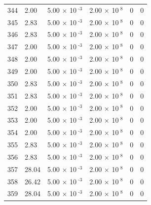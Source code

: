 \documentclass[a4paper,11pt]{article}
\begin{document}
\begin{center}
\begin{longtable}{|R{1.5cm}|R{2.4cm}|R{2.4cm}|R{2.4cm}|R{2.4cm}|R{2.4cm}|}
  344 &   2.00  &         5.00 $\times$ 10$^{\text{          -3}}$  &         2.00 $\times$ 10$^{\text{           8}}$  & 0  & 0 \\
  345 &   2.83  &         5.00 $\times$ 10$^{\text{          -3}}$  &         2.00 $\times$ 10$^{\text{           8}}$  & 0  & 0 \\
  346 &   2.83  &         5.00 $\times$ 10$^{\text{          -3}}$  &         2.00 $\times$ 10$^{\text{           8}}$  & 0  & 0 \\
  347 &   2.00  &         5.00 $\times$ 10$^{\text{          -3}}$  &         2.00 $\times$ 10$^{\text{           8}}$  & 0  & 0 \\
  348 &   2.00  &         5.00 $\times$ 10$^{\text{          -3}}$  &         2.00 $\times$ 10$^{\text{           8}}$  & 0  & 0 \\
  349 &   2.00  &         5.00 $\times$ 10$^{\text{          -3}}$  &         2.00 $\times$ 10$^{\text{           8}}$  & 0  & 0 \\
  350 &   2.83  &         5.00 $\times$ 10$^{\text{          -3}}$  &         2.00 $\times$ 10$^{\text{           8}}$  & 0  & 0 \\
  351 &   2.83  &         5.00 $\times$ 10$^{\text{          -3}}$  &         2.00 $\times$ 10$^{\text{           8}}$  & 0  & 0 \\
  352 &   2.00  &         5.00 $\times$ 10$^{\text{          -3}}$  &         2.00 $\times$ 10$^{\text{           8}}$  & 0  & 0 \\
  353 &   2.00  &         5.00 $\times$ 10$^{\text{          -3}}$  &         2.00 $\times$ 10$^{\text{           8}}$  & 0  & 0 \\
  354 &   2.00  &         5.00 $\times$ 10$^{\text{          -3}}$  &         2.00 $\times$ 10$^{\text{           8}}$  & 0  & 0 \\
  355 &   2.83  &         5.00 $\times$ 10$^{\text{          -3}}$  &         2.00 $\times$ 10$^{\text{           8}}$  & 0  & 0 \\
  356 &   2.83  &         5.00 $\times$ 10$^{\text{          -3}}$  &         2.00 $\times$ 10$^{\text{           8}}$  & 0  & 0 \\
  357 &  28.04  &         5.00 $\times$ 10$^{\text{          -3}}$  &         2.00 $\times$ 10$^{\text{           8}}$  & 0  & 0 \\
  358 &  26.42  &         5.00 $\times$ 10$^{\text{          -3}}$  &         2.00 $\times$ 10$^{\text{           8}}$  & 0  & 0 \\
  359 &  28.04  &         5.00 $\times$ 10$^{\text{          -3}}$  &         2.00 $\times$ 10$^{\text{           8}}$  & 0  & 0 \\

\end{longtable}
\end{center}
\end{document}
